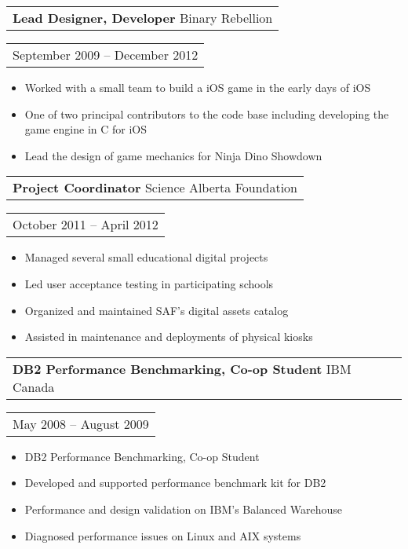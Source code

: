 \documentclass{resume}
\begin{document}
\begin{resume}
    \begin{tabular}[t]{@{}l}
        {\bf Lead Designer, Developer} Binary Rebellion
    \end{tabular}\vspace{+0.05in}
    \hfill
    \begin{tabular}[t]{l@{}}
        September 2009 -- December 2012
    \end{tabular}
    \begin{itemize} \itemsep -2pt
    \item Worked with a small team to build a iOS game in the early days of iOS
    \item One of two principal contributors to the code base including developing the game engine in C for iOS
    \item Lead the design of game mechanics for Ninja Dino Showdown
    \end{itemize}

    \newpage
    \begin{tabular}[t]{@{}l}
        {\bf Project Coordinator} Science Alberta Foundation
    \end{tabular}\vspace{+0.05in}
    \hfill
    \begin{tabular}[t]{l@{}}
        October 2011 -- April 2012
    \end{tabular}
    \begin{itemize} \itemsep -2pt
    \item Managed several small educational digital projects
    \item Led user acceptance testing in participating schools
    \item Organized and maintained SAF’s digital assets catalog
    \item Assisted in maintenance and deployments of physical kiosks
    \end{itemize}

    \begin{tabular}[t]{@{}l}
        {\bf DB2 Performance Benchmarking, Co-op Student} IBM Canada
    \end{tabular}\vspace{+0.05in}
    \hfill
    \begin{tabular}[t]{l@{}}
        May 2008 -- August 2009
    \end{tabular}
	\begin{itemize} \itemsep -2pt
    \item DB2 Performance Benchmarking, Co-op Student
    \item Developed and supported performance benchmark kit for DB2
    \item Performance and design validation on IBM’s Balanced Warehouse
    \item Diagnosed performance issues on Linux and AIX systems
    \end{itemize}


\end{resume}
\end{document}
